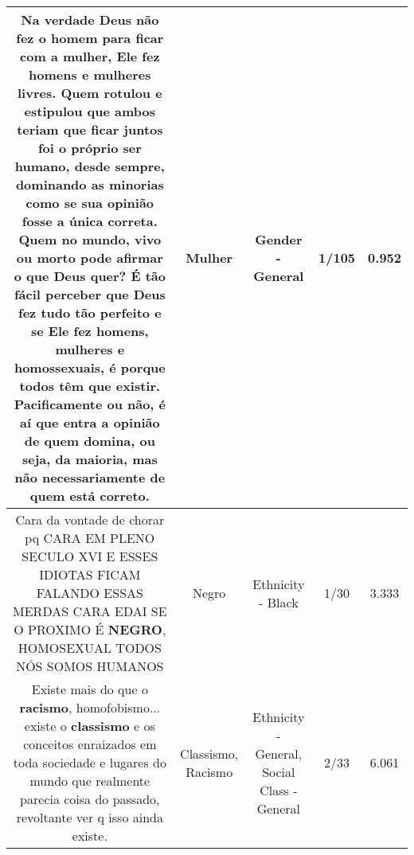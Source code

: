 \documentclass[11pt]{article}
\newlength\mylength
\begin{document}
\begin{center}
\begin{longtable}{|C{.65\mylength}|C{.30\mylength}|C{.12\mylength}|C{.12\mylength}|C{.12\mylength}|}
  \small Na verdade Deus não fez o homem para ficar com a \textbf{mulher}, Ele fez homens e mulheres livres. Quem rotulou e estipulou que ambos teriam que ficar juntos foi o próprio ser humano, desde sempre, dominando as minorias como se sua opinião fosse a única correta. Quem no mundo, vivo ou morto pode afirmar o que Deus quer? É tão fácil perceber que Deus fez tudo tão perfeito e se Ele fez homens, mulheres e homossexuais, é porque todos têm que existir. Pacificamente ou não, é aí que entra a opinião de quem domina, ou seja, da maioria, mas não necessariamente  de quem está correto.\normalsize   & Mulher & Gender - General & 1/105 & 0.952 \\  \hline
  \small Cara da vontade de chorar pq CARA EM PLENO SECULO XVI E ESSES IDIOTAS FICAM FALANDO ESSAS MERDAS CARA EDAI SE O PROXIMO É \textbf{NEGRO}, HOMOSEXUAL TODOS NÓS SOMOS HUMANOS\normalsize   & Negro & Ethnicity - Black & 1/30 & 3.333 \\  \hline
  \small Existe mais do que o \textbf{racismo}, homofobismo... existe o \textbf{classismo} e os conceitos enraizados em toda sociedade e lugares do mundo que realmente parecia coisa do passado, revoltante ver q isso ainda existe.\normalsize   & Classismo, Racismo & Ethnicity - General, Social Class - General & 2/33 & 6.061 \\  \hline

\end{longtable}
\end{center}
\end{document}
